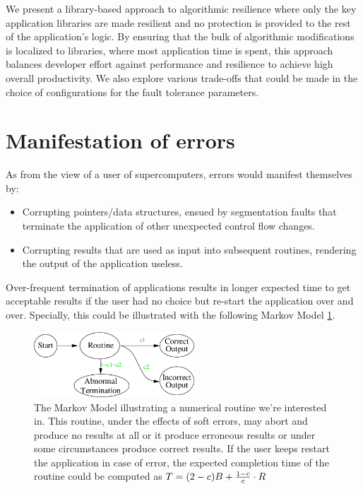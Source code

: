\documentclass{article}
\begin{document}
We present a library-based approach to algorithmic
resilience where only the key application libraries are made
resilient and no protection is provided to the rest of the
application’s logic. By ensuring that the bulk of algorithmic
modifications is localized to libraries, where most application
time is spent, this approach balances developer effort against
performance and resilience to achieve high overall
productivity. We also explore various trade-offs that could be made in the choice of configurations for the fault tolerance parameters.


\section{Manifestation of errors}

As from the view of a user of supercomputers, errors would manifest themselves by:
\begin{itemize}
\item{Corrupting pointers/data structures, ensued by segmentation faults that terminate the application of other unexpected control flow changes.}
\item{Corrupting results that are used as input into subsequent routines, rendering the output of the application useless.}
\end{itemize}

Over-frequent termination of applications results in longer expected time to get acceptable results if the user had no choice but re-start the application over and over. Specially, this could be illustrated with the following Markov Model \ref{markovModel}.

\begin{figure}
\includegraphics[width=6cm,natwidth=398,natheight=162]{routine_markov.png}
\caption{The Markov Model illustrating a numerical routine we're interested in. This routine, under the effects of soft errors, may abort and produce no results at all or it produce erroneous results or under some circumstances produce correct results. If the user keeps restart the application in case of error, the expected completion time of the routine could be computed as $T=(2-c)B+{{1-c} \over {c}} \cdot R$}
\label{markovModel}
\end{figure}
\end{document}
